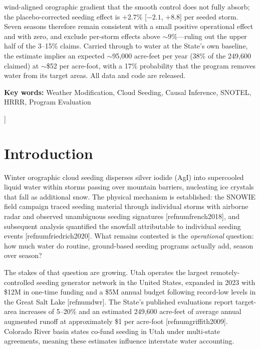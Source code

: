 \documentclass[9pt,twocolumn,twoside]{article}
\newcommand{\keywords}[1]{\vspace{0.5em}\noindent\textsf{\textbf{Key words:}} #1}
\newcommand{\citeparen}[1]{[\csname refnum#1\endcsname]}
\begin{document}
{{wind-aligned orographic gradient that the smooth control does not fully
absorb; the placebo-corrected seeding effect is $+2.7\%$ [$-2.1$, $+8.8$] per
seeded storm. Seven seasons therefore remain consistent with a small positive
operational effect and with zero, and exclude per-storm effects above
$\sim$9\%---ruling out the upper half of the 3--15\% claims. Carried through to
water at the State's own baseline, the estimate implies an expected
$\sim$95{,}000 acre-feet per year (38\% of the 249{,}600 claimed) at
$\sim$\$52 per acre-foot, with a 17\% probability that the program removes
water from its target areas. All data and code are released.
\par}
\vspace{0.6em}
{\noindent\small\keywords{Weather Modification, Cloud Seeding, Causal Inference, SNOTEL, HRRR, Program Evaluation}\par}
\vspace{1.6em}
}]

\section{Introduction}

Winter orographic cloud seeding disperses silver iodide (AgI) into
supercooled liquid water within storms passing over mountain barriers,
nucleating ice crystals that fall as additional snow. The physical mechanism
is established: the SNOWIE field campaign traced seeding material through
individual storms with airborne radar and observed unambiguous seeding
signatures \citeparen{french2018}, and subsequent analysis quantified the
snowfall attributable to individual seeding events \citeparen{friedrich2020}.
What remains contested is the \emph{operational} question: how much water do
routine, ground-based seeding programs actually add, season over season?

The stakes of that question are growing. Utah operates the largest
remotely-controlled seeding generator network in the United States,
expanded in 2023 with \$12M in one-time funding and a \$5M annual budget
following record-low levels in the Great Salt Lake \citeparen{dwr}. The
State's published evaluations report target-area increases of 5--20\% and an
estimated 249{,}600 acre-feet of average annual augmented runoff at
approximately \$1 per acre-foot \citeparen{griffith2009}. Colorado River
basin states co-fund seeding in Utah under multi-state agreements, meaning
these estimates influence interstate water accounting.
\end{document}

